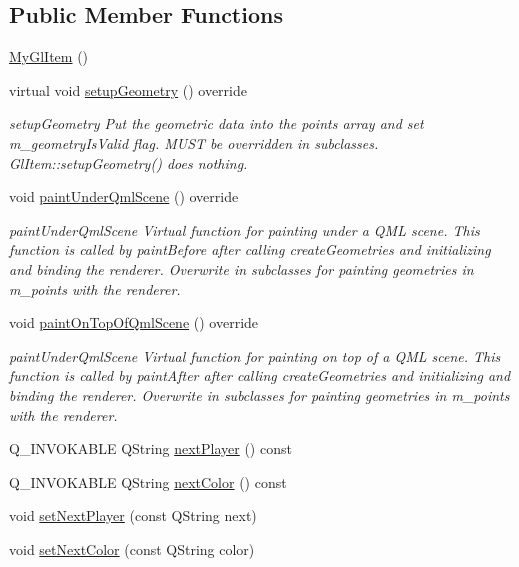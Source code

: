 \subsection*{Public Member Functions}
\begin{DoxyCompactItemize}
\item 
\mbox{\hyperlink{class_my_gl_item_a6d3e3403cb04102489d3be0deddbc1ff}{My\+Gl\+Item}} ()
\item 
virtual void \mbox{\hyperlink{class_my_gl_item_a27704a445b6915b4f365193bf0cab618}{setup\+Geometry}} () override
\begin{DoxyCompactList}\small\item\em setup\+Geometry Put the geometric data into the points array and set m\+\_\+geometry\+Is\+Valid flag. M\+U\+ST be overridden in subclasses. Gl\+Item\+::setup\+Geometry() does nothing. \end{DoxyCompactList}\item 
void \mbox{\hyperlink{class_my_gl_item_a46ffc33e9892262f9d1d88c14fa0e092}{paint\+Under\+Qml\+Scene}} () override
\begin{DoxyCompactList}\small\item\em paint\+Under\+Qml\+Scene Virtual function for painting under a Q\+ML scene. This function is called by paint\+Before after calling create\+Geometries and initializing and binding the renderer. Overwrite in subclasses for painting geometries in m\+\_\+points with the renderer. \end{DoxyCompactList}\item 
void \mbox{\hyperlink{class_my_gl_item_ad9f060b5a805367e0fbf065e9318c0b1}{paint\+On\+Top\+Of\+Qml\+Scene}} () override
\begin{DoxyCompactList}\small\item\em paint\+Under\+Qml\+Scene Virtual function for painting on top of a Q\+ML scene. This function is called by paint\+After after calling create\+Geometries and initializing and binding the renderer. Overwrite in subclasses for painting geometries in m\+\_\+points with the renderer. \end{DoxyCompactList}\item 
Q\+\_\+\+I\+N\+V\+O\+K\+A\+B\+LE Q\+String \mbox{\hyperlink{class_my_gl_item_a32e2b4ee36ad4c6e350e6faaa3f785ec}{next\+Player}} () const
\item 
Q\+\_\+\+I\+N\+V\+O\+K\+A\+B\+LE Q\+String \mbox{\hyperlink{class_my_gl_item_a4ab53ef3f231b8d77afb50fe2dbf227f}{next\+Color}} () const
\item 
void \mbox{\hyperlink{class_my_gl_item_a846c52113dee3039823114ace76ad670}{set\+Next\+Player}} (const Q\+String next)
\item 
void \mbox{\hyperlink{class_my_gl_item_a775133f2d5f5fee4b90f4816ac00d57e}{set\+Next\+Color}} (const Q\+String color)
\end{DoxyCompactItemize}

